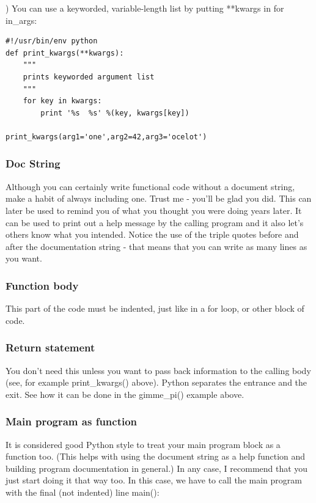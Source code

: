 \documentclass[11pt]{book}
\begin{document}
{{{) You can use a keyworded, variable-length list by putting **kwargs in for in\_args:

{ \color{blue} \begin{verbatim}
#!/usr/bin/env python
def print_kwargs(**kwargs):
    """
    prints keyworded argument list
    """
    for key in kwargs:
        print '%s  %s' %(key, kwargs[key])
     
print_kwargs(arg1='one',arg2=42,arg3='ocelot')
\end{verbatim}}

 \subsubsection{Doc String}
 Although you can certainly write functional code without a document string, make a habit of always including one.  Trust me - you'll be glad you did.  This can later be used to remind you of what you thought you were doing years later.  It can be used to print out a help message by the calling program and it also let's others know what you intended.   Notice the use of the triple quotes before and after the documentation string - that means that you can write as many lines as you want.  
 
 \subsubsection{Function body}
 This part of the code must be indented, just like in a for loop, or other block of code.  
 
 \subsubsection{Return statement}
 You don't need this unless you want to pass back information to the calling body (see, for example {\color{blue}print\_kwargs()} above).  Python separates the entrance and the exit.  See how it can be done in the {\color{blue}gimme\_pi()} example above.    
 
 \subsubsection{Main program as function}
 
 It is considered good Python style to treat your main program block as a function too.  (This helps with using the document string as a help function and building program documentation in general.)  In any case, I recommend that you just start doing it that way too.  In this case,  we have to call the main program with the final (not indented) line {\color{blue}main()}:

}}}
\end{document}
